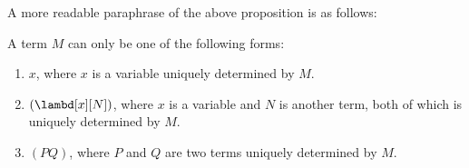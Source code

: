 \documentclass[../../../include/open-logic-section]{subfiles}
\begin{document}
A more readable paraphrase of the above proposition is as follows:
\begin{prop}
  A term $M$ can only be one of the following forms:
  \begin{enumerate}
    \item[\rule{VAR}] $x$, where $x$ is a variable uniquely determined by $M$.
    \item[\rule{ABS}] $(\lambd[x][N])$, where $x$ is a variable and $N$ is
      another term, both of which is uniquely determined by $M$.
    \item[\rule{APP}] $(PQ)$, where $P$ and $Q$ are two terms uniquely
      determined by $M$.
  \end{enumerate}
\end{prop}
\end{document}
